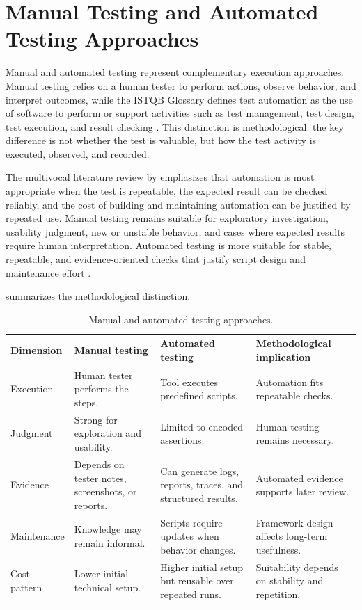 \section{Manual Testing and Automated Testing Approaches}
\label{sec:ch2-manual-automated-testing}

Manual and automated testing represent complementary execution approaches. Manual testing relies on a human tester to perform actions, observe behavior, and interpret outcomes, while the ISTQB Glossary defines test automation as the use of software to perform or support activities such as test management, test design, test execution, and result checking \autocite{istqb_glossary_test_automation_2026}. This distinction is methodological: the key difference is not whether the test is valuable, but how the test activity is executed, observed, and recorded.

The multivocal literature review by \textcite{garousi_mantyla_automation_2016} emphasizes that automation is most appropriate when the test is repeatable, the expected result can be checked reliably, and the cost of building and maintaining automation can be justified by repeated use. Manual testing remains suitable for exploratory investigation, usability judgment, new or unstable behavior, and cases where expected results require human interpretation. Automated testing is more suitable for stable, repeatable, and evidence-oriented checks that justify script design and maintenance effort \autocite{istqb_ctfl_syllabus_2024,garousi_mantyla_automation_2016}.

 summarizes the methodological distinction.

\begin{table}[htbp]
  \centering
  \tablefont
  \begin{tabularx}{\textwidth}{YYYY}
    \toprule
    Dimension & Manual testing & Automated testing & Methodological implication \\
    \midrule
    Execution & Human tester performs the steps. & Tool executes predefined scripts. & Automation fits repeatable checks. \\
    Judgment & Strong for exploration and usability. & Limited to encoded assertions. & Human testing remains necessary. \\
    Evidence & Depends on tester notes, screenshots, or reports. & Can generate logs, reports, traces, and structured results. & Automated evidence supports later review. \\
    Maintenance & Knowledge may remain informal. & Scripts require updates when behavior changes. & Framework design affects long-term usefulness. \\
    Cost pattern & Lower initial technical setup. & Higher initial setup but reusable over repeated runs. & Suitability depends on stability and repetition. \\
    \bottomrule
  \end{tabularx}
  \caption{Manual and automated testing approaches.}
  \label{tab:manual-automated-testing-approaches}
\end{table}

